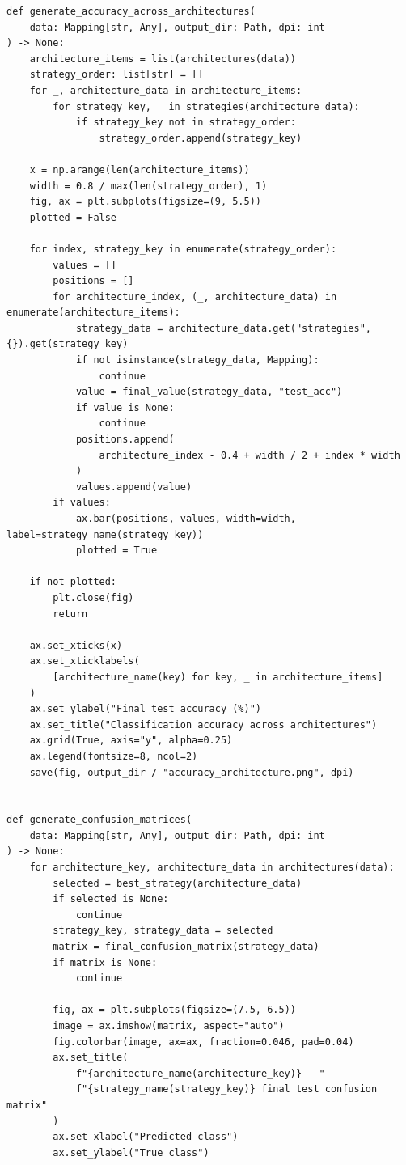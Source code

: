 \begin{verbatim}
def generate_accuracy_across_architectures(
    data: Mapping[str, Any], output_dir: Path, dpi: int
) -> None:
    architecture_items = list(architectures(data))
    strategy_order: list[str] = []
    for _, architecture_data in architecture_items:
        for strategy_key, _ in strategies(architecture_data):
            if strategy_key not in strategy_order:
                strategy_order.append(strategy_key)

    x = np.arange(len(architecture_items))
    width = 0.8 / max(len(strategy_order), 1)
    fig, ax = plt.subplots(figsize=(9, 5.5))
    plotted = False

    for index, strategy_key in enumerate(strategy_order):
        values = []
        positions = []
        for architecture_index, (_, architecture_data) in enumerate(architecture_items):
            strategy_data = architecture_data.get("strategies", {}).get(strategy_key)
            if not isinstance(strategy_data, Mapping):
                continue
            value = final_value(strategy_data, "test_acc")
            if value is None:
                continue
            positions.append(
                architecture_index - 0.4 + width / 2 + index * width
            )
            values.append(value)
        if values:
            ax.bar(positions, values, width=width, label=strategy_name(strategy_key))
            plotted = True

    if not plotted:
        plt.close(fig)
        return

    ax.set_xticks(x)
    ax.set_xticklabels(
        [architecture_name(key) for key, _ in architecture_items]
    )
    ax.set_ylabel("Final test accuracy (%)")
    ax.set_title("Classification accuracy across architectures")
    ax.grid(True, axis="y", alpha=0.25)
    ax.legend(fontsize=8, ncol=2)
    save(fig, output_dir / "accuracy_architecture.png", dpi)


def generate_confusion_matrices(
    data: Mapping[str, Any], output_dir: Path, dpi: int
) -> None:
    for architecture_key, architecture_data in architectures(data):
        selected = best_strategy(architecture_data)
        if selected is None:
            continue
        strategy_key, strategy_data = selected
        matrix = final_confusion_matrix(strategy_data)
        if matrix is None:
            continue

        fig, ax = plt.subplots(figsize=(7.5, 6.5))
        image = ax.imshow(matrix, aspect="auto")
        fig.colorbar(image, ax=ax, fraction=0.046, pad=0.04)
        ax.set_title(
            f"{architecture_name(architecture_key)} — "
            f"{strategy_name(strategy_key)} final test confusion matrix"
        )
        ax.set_xlabel("Predicted class")
        ax.set_ylabel("True class")


\end{verbatim}
